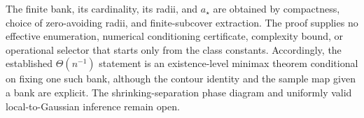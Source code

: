 The finite bank, its cardinality, its radii, and \(a_{\star}\) are obtained by compactness, choice of zero-avoiding radii, and finite-subcover extraction.  The proof supplies no effective enumeration, numerical conditioning certificate, complexity bound, or operational selector that starts only from the class constants.  Accordingly, the established \(\Theta(n^{-1})\) statement is an existence-level minimax theorem conditional on fixing one such bank, although the contour identity and the sample map given a bank are explicit.  The shrinking-separation phase diagram and uniformly valid local-to-Gaussian inference remain open.